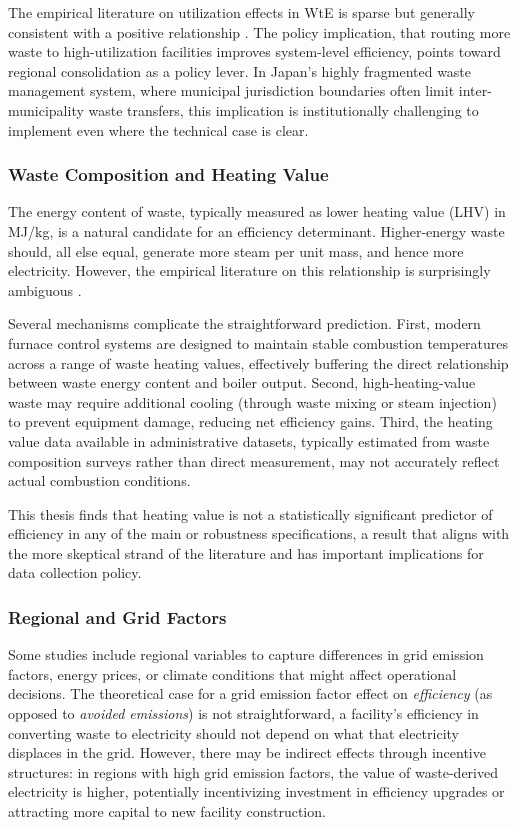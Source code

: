 \documentclass[12pt,a4paper]{article}
\begin{document}
The empirical literature on utilization effects in WtE is sparse but generally consistent with a positive relationship \citep{Beylot2015}. The policy implication, that routing more waste to high-utilization facilities improves system-level efficiency, points toward regional consolidation as a policy lever. In Japan's highly fragmented waste management system, where municipal jurisdiction boundaries often limit inter-municipality waste transfers, this implication is institutionally challenging to implement even where the technical case is clear.

\subsubsection{Waste Composition and Heating Value}

The energy content of waste, typically measured as lower heating value (LHV) in MJ/kg, is a natural candidate for an efficiency determinant. Higher-energy waste should, all else equal, generate more steam per unit mass, and hence more electricity. However, the empirical literature on this relationship is surprisingly ambiguous \citep{Astrup2009}.

Several mechanisms complicate the straightforward prediction. First, modern furnace control systems are designed to maintain stable combustion temperatures across a range of waste heating values, effectively buffering the direct relationship between waste energy content and boiler output. Second, high-heating-value waste may require additional cooling (through waste mixing or steam injection) to prevent equipment damage, reducing net efficiency gains. Third, the heating value data available in administrative datasets, typically estimated from waste composition surveys rather than direct measurement, may not accurately reflect actual combustion conditions.

This thesis finds that heating value is not a statistically significant predictor of efficiency in any of the main or robustness specifications, a result that aligns with the more skeptical strand of the literature and has important implications for data collection policy.

\subsubsection{Regional and Grid Factors}

Some studies include regional variables to capture differences in grid emission factors, energy prices, or climate conditions that might affect operational decisions. The theoretical case for a grid emission factor effect on \emph{efficiency} (as opposed to \emph{avoided emissions}) is not straightforward, a facility's efficiency in converting waste to electricity should not depend on what that electricity displaces in the grid. However, there may be indirect effects through incentive structures: in regions with high grid emission factors, the value of waste-derived electricity is higher, potentially incentivizing investment in efficiency upgrades or attracting more capital to new facility construction.
\end{document}
